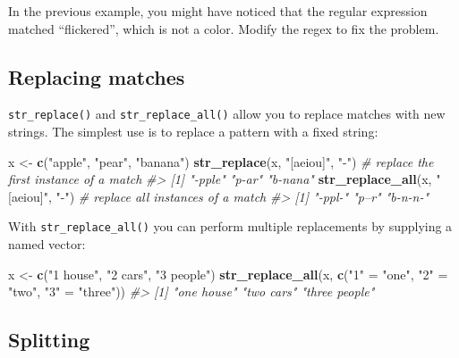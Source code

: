 \documentclass[]{book}
\newenvironment{Shaded}{\begin{snugshade}}{\end{snugshade}}
\newcommand{\KeywordTok}[1]{\textcolor[rgb]{0.13,0.29,0.53}{\textbf{#1}}}
\newcommand{\StringTok}[1]{\textcolor[rgb]{0.31,0.60,0.02}{#1}}
\newcommand{\CommentTok}[1]{\textcolor[rgb]{0.56,0.35,0.01}{\textit{#1}}}
\newcommand{\NormalTok}[1]{#1}
\begin{document}
In the previous example, you might have noticed that the regular
expression matched ``flickered'', which is not a color. Modify the regex
to fix the problem.

\subsection{Replacing matches}\label{replacing-matches}

\texttt{str\_replace()} and \texttt{str\_replace\_all()} allow you to
replace matches with new strings. The simplest use is to replace a
pattern with a fixed string:

\begin{Shaded}
\begin{Highlighting}[]
\NormalTok{x <-}\StringTok{ }\KeywordTok{c}\NormalTok{(}\StringTok{"apple"}\NormalTok{, }\StringTok{"pear"}\NormalTok{, }\StringTok{"banana"}\NormalTok{)}
\KeywordTok{str_replace}\NormalTok{(x, }\StringTok{"[aeiou]"}\NormalTok{, }\StringTok{"-"}\NormalTok{) }\CommentTok{# replace the first instance of a match}
\CommentTok{#> [1] "-pple"  "p-ar"   "b-nana"}
\KeywordTok{str_replace_all}\NormalTok{(x, }\StringTok{"[aeiou]"}\NormalTok{, }\StringTok{"-"}\NormalTok{) }\CommentTok{# replace all instances of a match}
\CommentTok{#> [1] "-ppl-"  "p--r"   "b-n-n-"}
\end{Highlighting}
\end{Shaded}

With \texttt{str\_replace\_all()} you can perform multiple replacements
by supplying a named vector:

\begin{Shaded}
\begin{Highlighting}[]
\NormalTok{x <-}\StringTok{ }\KeywordTok{c}\NormalTok{(}\StringTok{"1 house"}\NormalTok{, }\StringTok{"2 cars"}\NormalTok{, }\StringTok{"3 people"}\NormalTok{)}
\KeywordTok{str_replace_all}\NormalTok{(x, }\KeywordTok{c}\NormalTok{(}\StringTok{"1"}\NormalTok{ =}\StringTok{ "one"}\NormalTok{, }\StringTok{"2"}\NormalTok{ =}\StringTok{ "two"}\NormalTok{, }\StringTok{"3"}\NormalTok{ =}\StringTok{ "three"}\NormalTok{))}
\CommentTok{#> [1] "one house"    "two cars"     "three people"}
\end{Highlighting}
\end{Shaded}

\subsection{Splitting}\label{splitting}
\end{document}
